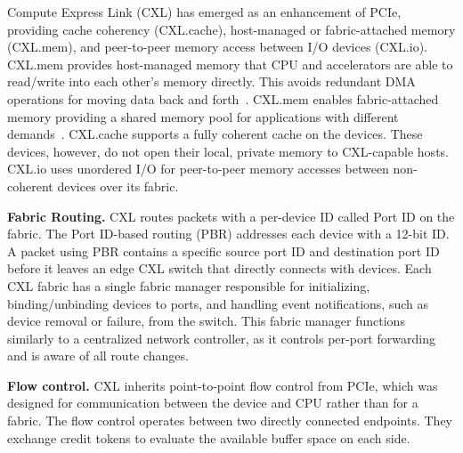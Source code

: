 Compute Express Link (CXL) has emerged as an enhancement of PCIe, providing cache coherency (CXL.cache), host-managed or fabric-attached memory (CXL.mem), and peer-to-peer memory access between I/O devices (CXL.io).
%
CXL.mem provides host-managed memory that CPU and accelerators are able to read/write into each other's memory directly. 
%
This avoids redundant DMA operations for moving data back and forth~\cite{fulcrum:hpca:2020, beacon:micro:2022, intel-cxl:ieee-micro:2023}.
%
CXL.mem enables fabric-attached memory providing a shared memory pool for applications with different demands~\cite{cxl-ssd:hotstorage:2022, directcxl:atc:2022, pond:asplos:2023}.
%
CXL.cache supports a fully coherent cache on the devices.
%
These devices, however, do not open their local, private memory to CXL-capable hosts. 
%
CXL.io uses unordered I/O for peer-to-peer memory accesses between non-coherent devices over its fabric.
%

\noindent \textbf{Fabric Routing.}
%
CXL routes packets with a per-device ID called Port ID on the fabric. 
%
The Port ID-based routing (PBR) addresses each device with a 12-bit ID. 
%
A packet using PBR contains a specific source port ID and destination port ID before it leaves an edge CXL switch that directly connects with devices.
%
Each CXL fabric has a single fabric manager responsible for initializing, binding/unbinding devices to ports, and handling event notifications, such as device removal or failure, from the switch.
%
This fabric manager functions similarly to a centralized network controller, as it controls per-port forwarding and is aware of all route changes.

\noindent \textbf{Flow control.}
CXL inherits point-to-point flow control from PCIe, which was designed for communication between the device and CPU rather than for a fabric.
%
The flow control operates between two directly connected endpoints.
%
They exchange credit tokens to evaluate the available buffer space on each side.

